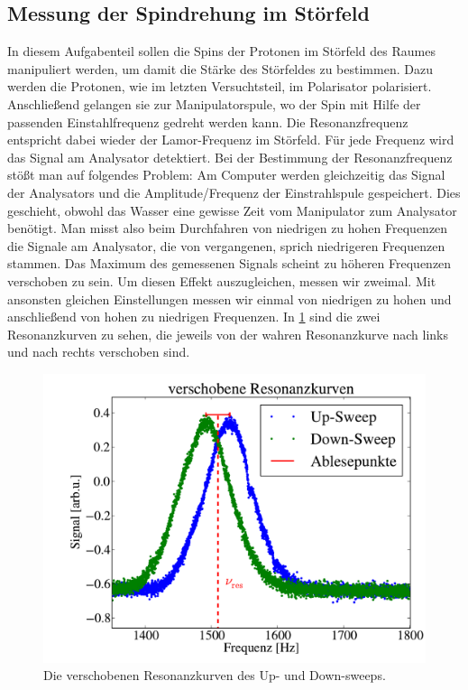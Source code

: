 \documentclass[paper=a4,
	fontsize=10pt,
	DIV=18,
	twocolumn,
	parskip=half
	]{scrartcl}
\numberwithin{equation}{section}    %
\begin{document}
\subsection{Messung der Spindrehung im Störfeld}
\label{auswertung5}
In diesem Aufgabenteil sollen die Spins der Protonen im Störfeld des Raumes manipuliert werden, um damit die Stärke des Störfeldes zu bestimmen.
Dazu werden die Protonen, wie im letzten Versuchtsteil, im Polarisator polarisiert.
Anschließend gelangen sie zur Manipulatorspule, wo der Spin mit Hilfe der passenden Einstahlfrequenz gedreht werden kann.
Die Resonanzfrequenz entspricht dabei wieder der Lamor-Frequenz im Störfeld.
Für jede Frequenz wird das Signal am Analysator detektiert.
Bei der Bestimmung der Resonanzfrequenz stößt man auf folgendes Problem:
Am Computer werden gleichzeitig das Signal der Analysators und die Amplitude/Frequenz der Einstrahlspule gespeichert.
Dies geschieht, obwohl das Wasser eine gewisse Zeit vom Manipulator zum Analysator benötigt.
Man misst also beim Durchfahren von niedrigen zu hohen Frequenzen die Signale am Analysator, die von vergangenen, sprich niedrigeren Frequenzen stammen.
Das Maximum des gemessenen Signals scheint zu höheren Frequenzen verschoben zu sein.
Um diesen Effekt auszugleichen, messen wir zweimal. 
Mit ansonsten gleichen Einstellungen messen wir einmal von niedrigen zu hohen und anschließend von hohen zu niedrigen Frequenzen.
In \cref{gewichte} sind die zwei Resonanzkurven zu sehen, die jeweils von der wahren Resonanzkurve nach links und nach rechts verschoben sind.
\begin{figure}[htp]
	\begin{center}
		\includegraphics[width=\columnwidth]{Data-Plots/05-Resonanzfrequenz.pdf}
		\caption{Die verschobenen Resonanzkurven des Up- und Down-sweeps.}
		\label{gewichte}
	\end{center}
\end{figure}
\end{document}
